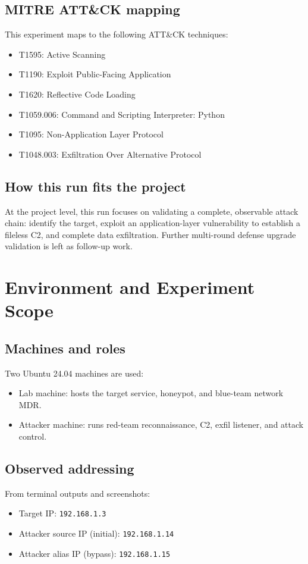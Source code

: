 \documentclass[11pt]{article}
\begin{document}
\subsection{MITRE ATT\&CK mapping}
This experiment maps to the following ATT\&CK techniques:
\begin{itemize}[leftmargin=*]
  \item T1595: Active Scanning
  \item T1190: Exploit Public-Facing Application
  \item T1620: Reflective Code Loading
  \item T1059.006: Command and Scripting Interpreter: Python
  \item T1095: Non-Application Layer Protocol
  \item T1048.003: Exfiltration Over Alternative Protocol
\end{itemize}

\subsection{How this run fits the project}
At the project level, this run focuses on validating a complete, observable attack chain: identify the target, exploit an application-layer vulnerability to establish a fileless C2, and complete data exfiltration. Further multi-round defense upgrade validation is left as follow-up work.

\section{Environment and Experiment Scope}

\subsection{Machines and roles}
Two Ubuntu 24.04 machines are used:
\begin{itemize}[leftmargin=*]
  \item Lab machine: hosts the target service, honeypot, and blue-team network MDR.
  \item Attacker machine: runs red-team reconnaissance, C2, exfil listener, and attack control.
\end{itemize}

\subsection{Observed addressing}
From terminal outputs and screenshots:
\begin{itemize}[leftmargin=*]
  \item Target IP: \texttt{192.168.1.3}
  \item Attacker source IP (initial): \texttt{192.168.1.14}
  \item Attacker alias IP (bypass): \texttt{192.168.1.15}
\end{itemize}
\end{document}
